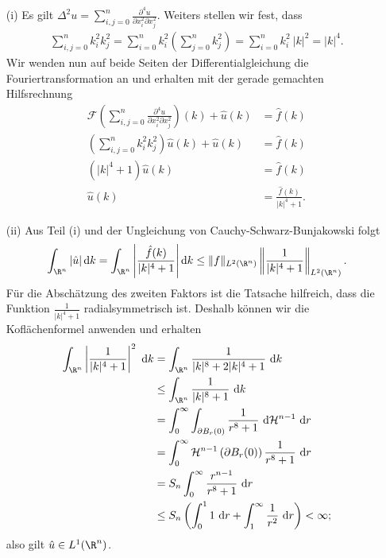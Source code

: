 \begin{solution}

\phantom{}\begin{itemize}
    \item[(i)] Es gilt $\Delta^2 u = \sum_{i, j=0}^n \frac{\partial^4 u}{\partial x_i^2 \partial x_j^2}.$ Weiters stellen wir fest, dass
    \begin{align*}
     \sum_{i, j=0}^n k_i^2 k_j^2 =
     \sum_{i = 0}^n k_i^2 \left(\sum_{j = 0}^n k_j^2\right) = \sum_{i = 0}^n k_i^2 ~|k|^2 = |k|^4.
    \end{align*}
    Wir wenden nun auf beide Seiten der Differentialgleichung die Fouriertransformation an und erhalten mit der gerade gemachten Hilfsrechnung
    \begin{align*}
     \mathcal{F}\left(\sum_{i, j=0}^n \frac{\partial^4 u}{\partial x_i^2 \partial x_j^2}\right)(k) + \hat u(k) &= \hat f(k) \\
     \left(\sum_{i, j=0}^n k_i^2 k_j^2\right) \hat u(k) + \hat u(k) &= \hat f(k) \\
     \left(|k|^4 + 1\right)\hat u(k) &= \hat f(k) \\
     \hat u(k) &= \frac{\hat f(k)}{|k|^4 + 1}.
    \end{align*}
    \item[(ii)] Aus Teil (i) und der Ungleichung von Cauchy-Schwarz-Bunjakowski folgt
    \begin{align*}
        \int_{\R^n} \left| \hat u \right| \mathrm{d}k = \int_{\R^n} \left| \frac{\hat f(k)}{|k|^4 + 1} \right| \mathrm{d}k \leq \|f\|_{L^2(\R^n)} \left\|\frac{1}{|k|^4 + 1}\right\|_{L^2(\R^n)}.
    \end{align*}
    Für die Abschätzung des zweiten Faktors ist die Tatsache hilfreich, dass die Funktion $\frac{1}{|k|^4 + 1}$ radialsymmetrisch ist. Deshalb können wir die Koflächenformel anwenden und erhalten
    \begin{align*}
        \int_{\R^n} \left| \frac{1}{|k|^4 + 1} \right|^2 ~\mathrm{d}k &=
        \int_{\R^n} \frac{1}{|k|^8 + 2|k|^4 + 1} ~\mathrm{d}k\\ &\leq \int_{\R^n} \frac{1}{|k|^8 + 1} ~\mathrm{d}k\\
        &= \int_0^\infty \int_{\partial B_r(0)} \frac{1}{r^8 + 1} ~\mathrm{d}\mathcal{H}^{n-1} ~\mathrm{d}r\\
        &= \int_0^\infty \mathcal{H}^{n-1}\left(\partial B_r(0)\right) \frac{1}{r^8 + 1} ~\mathrm{d}r\\
        &= S_n \int_0^\infty \frac{r^{n-1}}{r^8 + 1}
        ~\mathrm{d}r\\
        &\leq S_n \left(\int_0^1 1~
        \mathrm{d}r + \int_1^\infty \frac{1}{r^2}
        ~\mathrm{d}r\right) < \infty;
    \end{align*}
    also gilt $\hat u \in L^1(\R^n)$.


\end{itemize}
\end{solution}
